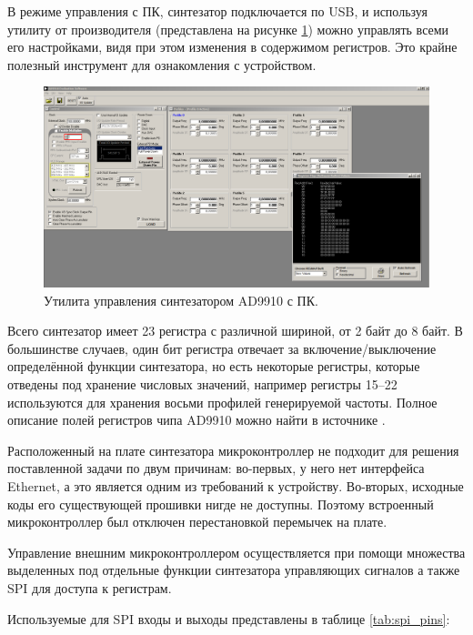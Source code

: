 \documentclass[rusmathsym, eqnumwithinsec, amspack, hyperref]{bomgost}
\begin{document}
В режиме управления с ПК, синтезатор подключается по USB, и используя утилиту от производителя (представлена на рисунке \ref{fig:ad9910_evaluation_software}) можно управлять всеми его настройками, видя при этом изменения в содержимом регистров. Это крайне полезный инструмент для ознакомления с устройством.

\begin{gostfigure}
\begin{figure}[H]
\centering
\includegraphics[scale=.25]{data/ad9910_evaluation_software.png}
\caption{Утилита управления синтезатором AD9910 с ПК.}
\label{fig:ad9910_evaluation_software}
\end{figure}
\end{gostfigure}

Всего синтезатор имеет 23 регистра с различной шириной, от 2 байт до 8 байт. В большинстве случаев, один бит регистра отвечает за включение/выключение определённой функции синтезатора, но есть некоторые регистры, которые отведены под хранение числовых значений, например регистры 15–22 используются для хранения восьми профилей генерируемой частоты. Полное описание полей регистров чипа AD9910 можно найти в источнике \cite{AD9910Datasheet}.

Расположенный на плате синтезатора микроконтроллер не подходит для решения поставленной задачи по двум причинам: во-первых, у него нет интерфейса Ethernet, а это является одним из требований к устройству. Во-вторых, исходные коды его существующей прошивки нигде не доступны. Поэтому встроенный микроконтроллер был отключен перестановкой перемычек на плате.

Управление внешним микроконтроллером осуществляется при помощи множества выделенных под отдельные функции синтезатора управляющих сигналов а также SPI для доступа к регистрам.

Используемые для SPI входы и выходы представлены в таблице \ref{tab:spi_pins}:
\end{document}
